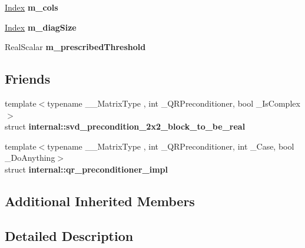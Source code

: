 \begin{DoxyCompactItemize}
\item 
\mbox{\label{class_eigen_1_1_jacobi_s_v_d_a65e1a36d7d3d90ad143fa6a6494695c9}} 
\mbox{\hyperlink{class_eigen_1_1_s_v_d_base_a6229a37997eca1072b52cca5ee7a2bec}{Index}} {\bfseries m\+\_\+cols}
\item 
\mbox{\label{class_eigen_1_1_jacobi_s_v_d_a6eca3829eb56684ca01c291c6630c8d8}} 
\mbox{\hyperlink{class_eigen_1_1_s_v_d_base_a6229a37997eca1072b52cca5ee7a2bec}{Index}} {\bfseries m\+\_\+diag\+Size}
\item 
\mbox{\label{class_eigen_1_1_jacobi_s_v_d_abbc1cfb200cc681ca18bdb1892597e62}} 
Real\+Scalar {\bfseries m\+\_\+prescribed\+Threshold}
\end{DoxyCompactItemize}
\subsection*{Friends}
\begin{DoxyCompactItemize}
\item 
\mbox{\label{class_eigen_1_1_jacobi_s_v_d_a88d510b611ce8922ee1457b5a6223658}} 
{\footnotesize template$<$typename \+\_\+\+\_\+\+Matrix\+Type , int \+\_\+\+Q\+R\+Preconditioner, bool \+\_\+\+Is\+Complex$>$ }\\struct {\bfseries internal\+::svd\+\_\+precondition\+\_\+2x2\+\_\+block\+\_\+to\+\_\+be\+\_\+real}
\item 
\mbox{\label{class_eigen_1_1_jacobi_s_v_d_a1d21ab8e3cfd531f14023c010d3335bc}} 
{\footnotesize template$<$typename \+\_\+\+\_\+\+Matrix\+Type , int \+\_\+\+Q\+R\+Preconditioner, int \+\_\+\+Case, bool \+\_\+\+Do\+Anything$>$ }\\struct {\bfseries internal\+::qr\+\_\+preconditioner\+\_\+impl}
\end{DoxyCompactItemize}
\subsection*{Additional Inherited Members}


\subsection{Detailed Description}
